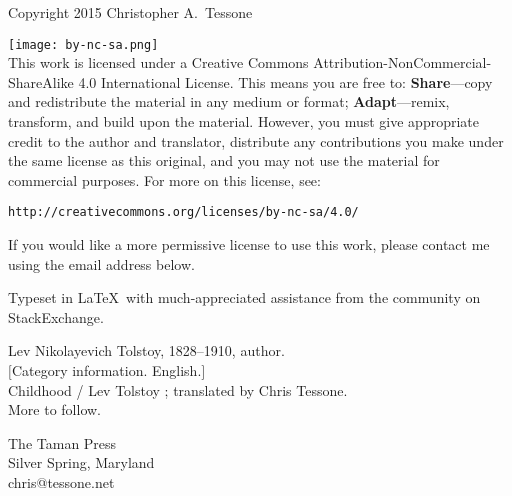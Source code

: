\begingroup 
\footnotesize 
\parindent 0pt 
\parskip \baselineskip 
Copyright \textcopyright{} 2015 Christopher A.~Tessone

\texttt{[image: by-nc-sa.png]}\\
This work is licensed under a Creative Commons
Attribution-NonCommercial-ShareAlike 4.0 International License. This
means you are free to: \textbf{Share}---copy and redistribute the
material in any medium or format; \textbf{Adapt}---remix, transform,
and build upon the material. However, you must give appropriate credit
to the author and translator, distribute any contributions you make
under the same license as this original, and you may not use the
material for commercial purposes. For more on this license, see:

\texttt{http://creativecommons.org/licenses/by-nc-sa/4.0/}

If you would like a more permissive license to use this work, please
contact me using the email address below.

Typeset in \LaTeX\ with much-appreciated assistance from the
community on StackExchange. %


Lev Nikolayevich Tolstoy, 1828--1910, author. \\
$[$Category information. English.$]$ \\
Childhood / Lev Tolstoy ; translated by Chris Tessone. \\
More to follow. 

\vfill 

The Taman Press\\
Silver Spring, Maryland\\
chris@tessone.net

\endgroup 
\pagestyle{empty}
\clearpage 
